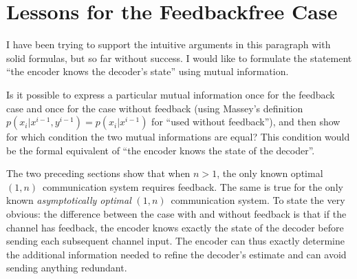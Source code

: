 


%
%


\section{Lessons for the Feedbackfree Case}

\begin{notebox}
  I have been trying to support the intuitive arguments in this paragraph with
  solid formulas, but so far without success. I would like to formulate the
  statement ``the encoder knows the decoder's state'' using mutual information.

  Is it possible to express a particular mutual information
  once for the feedback case and once for the case without feedback (using
  Massey's definition $p(x_i|x^{i-1},y^{i-1}) = p(x_i|x^{i-1})$ for ``used
  without feedback''), and then show for which condition the two mutual
  informations are equal? This condition would be the formal equivalent of ``the
  encoder knows the state of the decoder''.
\end{notebox}
The two preceding sections show that when $n > 1$, the only known optimal
$(1,n)$~communication system requires feedback. The same is true for the only
known \emph{asymptotically optimal} $(1,n)$~communication system.  To state the
very obvious: the difference between the case with and without feedback is that
if the channel has feedback, the encoder knows exactly the state of the decoder
before sending each subsequent channel input. The encoder can thus exactly
determine the additional information needed to refine the decoder's estimate and
can avoid sending anything redundant. 

